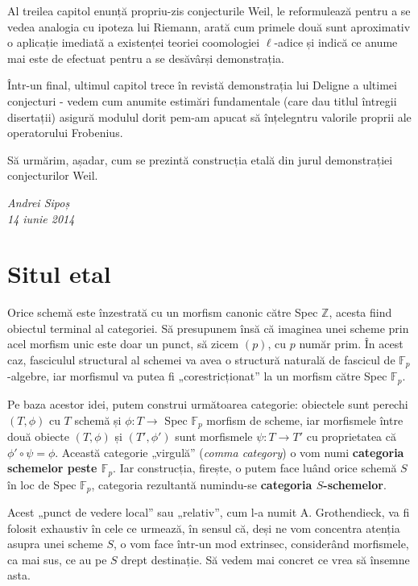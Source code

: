 \documentclass[13pt,openany,oneside]{book}
\begin{document}
Al treilea capitol enunță propriu-zis conjecturile Weil, le reformulează pentru a se vedea analogia cu ipoteza lui Riemann, arată cum primele două sunt aproximativ o aplicație imediată a existenței teoriei coomologiei $\ell$-adice și indică ce anume mai este de efectuat pentru a se desăvârși demonstrația.

Într-un final, ultimul capitol trece în revistă demonstrația lui Deligne a ultimei conjecturi - vedem cum anumite estimări fundamentale (care dau titlul întregii disertații) asigură modulul dorit pem-am apucat să înțelegntru valorile proprii ale operatorului Frobenius.

Să urmărim, așadar, cum se prezintă construcția etală din jurul demonstrației conjecturilor Weil.

\begin{flushright}
{\em Andrei Sipoș\\14 iunie 2014}
\end{flushright}

\newpage

\pagestyle{headings}
\setcounter{secnumdepth}{2}

\chapter{Situl etal}
\setcounter{page}{1}

Orice schemă este înzestrată cu un morfism canonic către Spec $\mathbb{Z}$, acesta fiind obiectul terminal al categoriei. Să presupunem însă că imaginea unei scheme prin acel morfism unic este doar un punct, să zicem $(p)$, cu $p$ număr prim. În acest caz, fasciculul structural al schemei va avea o structură naturală de fascicul de $\mathbb{F}_p$-algebre, iar morfismul va putea fi „corestricționat” la un morfism către Spec $\mathbb{F}_p$.

Pe baza acestor idei, putem construi următoarea categorie: obiectele sunt perechi $(T,\phi)$ cu $T$ schemă și $\phi: T \rightarrow$ Spec $\mathbb{F}_p$ morfism de scheme, iar morfismele între două obiecte $(T,\phi)$ și $(T',\phi')$ sunt morfismele $\psi: T \rightarrow T'$ cu proprietatea că $\phi'\circ\psi=\phi$. Această categorie „virgulă” ({\it comma category}) o vom numi {\bf categoria schemelor peste $\mathbb{F}_p$}. Iar construcția, firește, o putem face luând orice schemă $S$ în loc de Spec $\mathbb{F}_p$, categoria rezultantă numindu-se {\bf categoria $S$-schemelor}.

Acest „punct de vedere local” sau „relativ”, cum l-a numit A. Grothendieck, va fi folosit exhaustiv în cele ce urmează, în sensul că, deși ne vom concentra atenția asupra unei scheme $S$, o vom face într-un mod extrinsec, considerând morfismele, ca mai sus, ce au pe $S$ drept destinație. Să vedem mai concret ce vrea să însemne asta.
\end{document}
